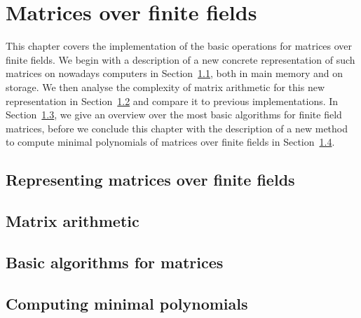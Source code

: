 
\chapter{Matrices over finite fields}

This chapter covers the implementation of the basic operations for matrices 
over finite fields. We begin with a description of a new concrete 
representation of such matrices on nowadays computers in 
Section~\ref{sec:ffematrices}, both in main memory and on storage.
We then analyse the complexity of matrix arithmetic for this new
representation in Section~\ref{sec:matarith} and compare it to
previous implementations. In Section~\ref{sec:basalgmat}, we give an
overview over the most basic algorithms for finite field matrices,
before we conclude this chapter with the description of a new method
to compute minimal polynomials of matrices over finite fields in
Section~\ref{sec:minpoly}.

\section{Representing matrices over finite fields}
\label{sec:ffematrices}



\section{Matrix arithmetic}
\label{sec:matarith}

\section{Basic algorithms for matrices}
\label{sec:basalgmat}

\section{Computing minimal polynomials}
\label{sec:minpoly}

